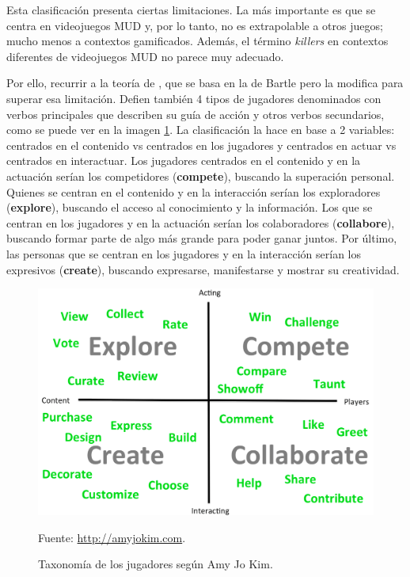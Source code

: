 Esta clasificación presenta ciertas limitaciones. 
%
La más importante es que se centra en videojuegos \gls{MUD} y, por lo tanto, no es extrapolable a otros juegos; mucho menos a contextos gamificados.
%
Además, el término \textit{killers} en contextos diferentes de videojuegos \gls{MUD} no parece muy adecuado.


%
Por ello, recurrir a la teoría de  \cite{AmyJoKim}, que se basa en la de Bartle pero la modifica para superar esa limitación.
%
Defien también 4 tipos de jugadores denominados con verbos principales que describen su guía de acción y otros verbos secundarios, como se puede ver en la imagen \ref{fig::AmyJoKim}.
%
La clasificación la hace en base a 2 variables: centrados en el contenido vs centrados en los jugadores y centrados en actuar vs centrados en interactuar.
%
Los jugadores centrados en el contenido y en la actuación serían los competidores (\textbf{compete}), buscando la superación personal.
%
Quienes se centran en el contenido y en la interacción serían los exploradores (\textbf{explore}), buscando el acceso al conocimiento y la información.
%
Los que se centran en los jugadores y en la actuación serían los colaboradores (\textbf{collabore}), buscando formar parte de algo más grande para poder ganar juntos.
%
Por último, las personas que se centran en los jugadores y en la interacción serían los expresivos (\textbf{create}), buscando expresarse, manifestarse y mostrar su creatividad.

\begin{figure}[hbt]
\begin{center}
\caption{Taxonomía de los jugadores según Amy Jo Kim.}
\label{fig::AmyJoKim}
\includegraphics[scale=0.25]{img/AmyJoKim.png}

\vspace{-0.25cm}
\small{Fuente: \url{http://amyjokim.com}.}
\end{center}
\end{figure}


